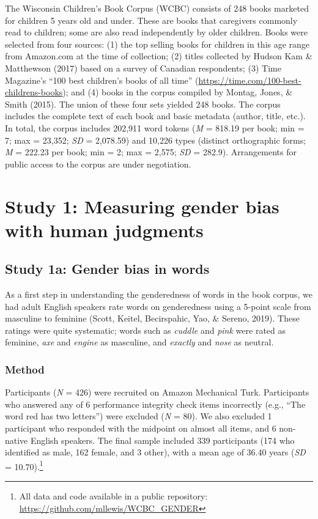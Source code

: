 \documentclass[
  english,
  ,man,floatsintext]{apa6}
\begin{document}
The Wisconsin Children's Book Corpus (WCBC) consists of 248 books marketed for children 5 years old and under. These are books that caregivers commonly read to children; some are also read independently by older children. Books were selected from four sources: (1) the top selling books for children in this age range from Amazon.com at the time of collection; (2) titles collected by Hudson Kam \& Matthewson (2017) based on a survey of Canadian respondents; (3) Time Magazine's \enquote{100 best children's books of all time} (\url{https://time.com/100-best-childrens-books}); and (4) books in the corpus compiled by Montag, Jones, \& Smith (2015). The union of these four sets yielded 248 books. The corpus includes the complete text of each book and basic metadata (author, title, etc.). In total, the corpus includes 202,911 word tokens (\emph{M} = 818.19 per book; min = 7; max = 23,352; \emph{SD} = 2,078.59) and 10,226 types (distinct orthographic forms; \emph{M} = 222.23 per book; min = 2; max = 2,575; \emph{SD} = 282.9). Arrangements for public access to the corpus are under negotiation.

\hypertarget{study-1-measuring-gender-bias-with-human-judgments}{%
\section{Study 1: Measuring gender bias with human judgments}\label{study-1-measuring-gender-bias-with-human-judgments}}

\hypertarget{study-1a-gender-bias-in-words}{%
\subsection{Study 1a: Gender bias in words}\label{study-1a-gender-bias-in-words}}

As a first step in understanding the genderedness of words in the book corpus, we had adult English speakers rate words on genderedness using a 5-point scale from masculine to feminine (Scott, Keitel, Becirspahic, Yao, \& Sereno, 2019). These ratings were quite systematic; words such as \emph{cuddle} and \emph{pink} were rated as feminine, \emph{axe} and \emph{engine} as masculine, and \emph{exactly} and \emph{nose} as neutral.

\hypertarget{method-1}{%
\subsubsection{Method}\label{method-1}}

Participants (\emph{N} = 426) were recruited on Amazon Mechanical Turk. Participants who answered any of 6 performance integrity check items incorrectly (e.g., \enquote{The word red has two letters}) were excluded (\emph{N} = 80). We also excluded 1 participant who responded with the midpoint on almost all items, and 6 non-native English speakers. The final sample included 339 participants (174 who identified as male, 162 female, and 3 other), with a mean age of 36.40 years (\emph{SD} = 10.70).\footnote{All data and code available in a public repository: \url{https://github.com/mllewis/WCBC_GENDER}}
\end{document}
